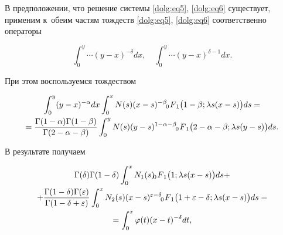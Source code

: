 В предположении, что решение системы \eqref{dolg:eq5}, \eqref{dolg:eq6} существует, применим к~обеим частям тождеств \eqref{dolg:eq5}, \eqref{dolg:eq6} соответственно операторы

$$\int _0^y \cdots (y-x)^{-\delta} dx,\quad \int _0^y \cdots (y-x)^{\delta-1} dx.$$

При этом воспользуемся тождеством

\begin{multline}

\int _0^y (y-x)^{-\alpha} dx \int_0^x N(s) (x-s)^{-\beta} \,\,

F_{\hspace{-4mm}0 \hspace{3mm}1} \bigl(1-\beta;\lambda s (x-s)\bigr) ds = 

\\

\label{dolg:eq8}

=\frac{\Gamma(1-\alpha) \Gamma(1-\beta)}{\Gamma(2-\alpha-\beta)} \int _0^y N(s) (y-s)^{1-\alpha-\beta} \,\,

F_{\hspace{-4mm}0 \hspace{3mm}1} \bigl(2-\alpha-\beta;\lambda s (y-s)\bigr) ds.

\end{multline}

В результате получаем

\begin{multline}

 \Gamma(\delta) \Gamma(1-\delta) \int _0^x N_1(s) \,\,

F_{\hspace{-4mm}0 \hspace{3mm}1} \bigl(1;\lambda s (x-s)\bigr) ds +\\

\label{dolg:eq9}

 + \frac{\Gamma(1-\delta) \Gamma(\varepsilon)}{\Gamma(1-\delta+\varepsilon)} \int _0^x N_2(s) (x-s)^{\varepsilon-\delta} 

\,\,

F_{\hspace{-4mm}0 \hspace{3mm}1} \bigl(1+\varepsilon-\delta;\lambda s (x-s)\bigr) ds =

\\

 = \int _0^x \varphi(t) (x-t)^{-\delta} dt,

\end{multline}

